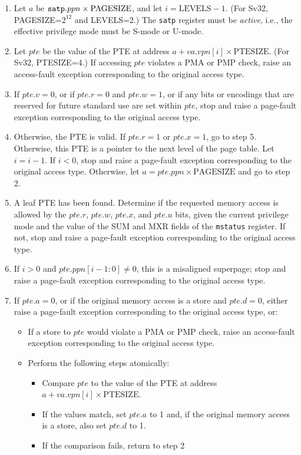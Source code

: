 \begin{enumerate}

  \item Let $a$ be ${\tt satp}.ppn \times \textrm{PAGESIZE}$, and let $i=\textrm{LEVELS} - 1$. (For Sv32, PAGESIZE=$2^{12}$ and LEVELS=2.)
    The {\tt satp} register must be {\em active}, i.e., the effective privilege
    mode must be S-mode or U-mode.
  
  \item Let $pte$ be the value of the PTE at address
    $a+va.vpn[i]\times \textrm{PTESIZE}$. (For Sv32, PTESIZE=4.)
    If accessing $pte$ violates a PMA or PMP check, raise an
    access-fault exception corresponding to the original access type.
  
  \item If $pte.v=0$, or if $pte.r=0$ and $pte.w=1$, or if any bits or encodings
    that are reserved for future standard use are set within $pte$, stop and
    raise a page-fault exception corresponding to the original access type.
  
  \item Otherwise, the PTE is valid.
    If $pte.r=1$ or $pte.x=1$, go to step 5.
    Otherwise, this PTE is a pointer to the next level of the page table.  Let
    $i=i-1$.  If $i<0$, stop and raise a page-fault exception
    corresponding to the original access type.  Otherwise, let
    $a=pte.ppn \times \textrm{PAGESIZE}$ and go to step 2.
  
  \item A leaf PTE has been found.  Determine if the requested memory access is
    allowed by the $pte.r$, $pte.w$, $pte.x$, and $pte.u$ bits, given the
    current privilege mode and the value of the SUM and MXR fields of
    the {\tt mstatus} register.  If not, stop and raise a page-fault
    exception corresponding to the original access type.
  
  \item If $i>0$ and $pte.ppn[i-1:0]\neq 0$, this is a misaligned superpage;
    stop and raise a page-fault exception corresponding to the original access type.
  
  \item If $pte.a=0$, or if the original memory access is a store and $pte.d=0$, either
    raise a page-fault exception corresponding to the original access type, or:
    \begin{itemize}
    \item If a store to $pte$ would violate a PMA or PMP check, raise an
      access-fault exception corresponding to the original access type.
    \item Perform the following steps atomically:
      \begin{itemize}
        \item Compare $pte$ to the value of the PTE at address $a+va.vpn[i]\times \textrm{PTESIZE}$.
        \item If the values match, set $pte.a$ to 1 and, if the original memory
          access is a store, also set $pte.d$ to 1.
        \item If the comparison fails, return to step 2
      \end{itemize}
    \end{itemize}
  

\end{enumerate}
